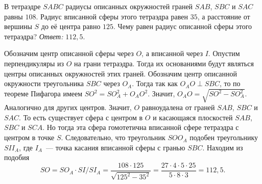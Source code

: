 \problem
В тетраэдре $SABC$ радиусы описанных окружностей граней $SAB$, $SBC$ и $SAC$
равны $108$.
Радиус вписанной сферы этого тетраэдра равен $35$, а расстояние от вершины $S$
до её центра равно $125$.
Чему равен радиус описанной сферы этого тетраэдра?
\solution
\emph{Ответ:} $112{,}5$.
\par
Обозначим центр описанной сферы через $O$, а вписанной через $I$.
Опустим перпендикуляры из $O$ на грани тетраэдра.
Тогда их основаниями будут являться центры описанных окружностей этих граней.
Обозначим центр описанной окружности треугольника $SBC$ через $O_A$.
Тогда так как $O_AO \perp SBC$, то по теореме Пифагора имеем
$SO^2 = SO_A^2 + O_AO^2$.
Значит, $O_AO = \sqrt{SO^2 - SO_A^2}$.
Аналогично для других центров.
Значит, $O$ равноудалена от граней $SAB$, $SBC$ и $SAC$.
То есть существует сфера с центром в $O$ и касающаяся плоскостей
$SAB$, $SBC$ и $SCA$.
Но тогда эта сфера гомотетична вписанной сфере тетраэдра с центром в точке $S$.
Следовательно, что треугольник $SOO_A$ подобен треугольнику $SII_A$,
где $I_A$~--- точка касания вписанной сферы с гранью $SBC$.
Находим из подобия
\[
    SO
=
    SO_A \cdot SI / SI_A
=
    \dfrac{108 \cdot 125}{\sqrt{125^2 - 35^2}}
=
    \dfrac{27 \cdot 4 \cdot 5 \cdot 25}{5 \cdot 8 \cdot 3}
=
    112{,}5
.\]
\endproblem
